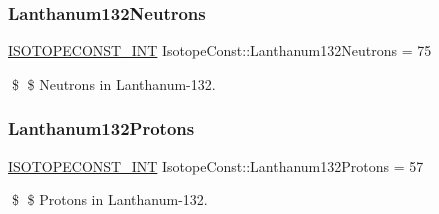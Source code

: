 \subsubsection{\texorpdfstring{Lanthanum132\+Neutrons}{Lanthanum132Neutrons}}
{\footnotesize\ttfamily \mbox{\hyperlink{group___isotope_const-_macros_ga5f18360b3e99483a35c32d789e62621c}{I\+S\+O\+T\+O\+P\+E\+C\+O\+N\+S\+T\+\_\+\+I\+NT}} Isotope\+Const\+::\+Lanthanum132\+Neutrons = 75}

\$ \$ Neutrons in Lanthanum-\/132. \mbox{\label{group___isotope_const-_lanthanum-_la132_ga02d54c86a250f7e9a6d0bad17d8aceae}} 
\subsubsection{\texorpdfstring{Lanthanum132\+Protons}{Lanthanum132Protons}}
{\footnotesize\ttfamily \mbox{\hyperlink{group___isotope_const-_macros_ga5f18360b3e99483a35c32d789e62621c}{I\+S\+O\+T\+O\+P\+E\+C\+O\+N\+S\+T\+\_\+\+I\+NT}} Isotope\+Const\+::\+Lanthanum132\+Protons = 57}

\$ \$ Protons in Lanthanum-\/132. 